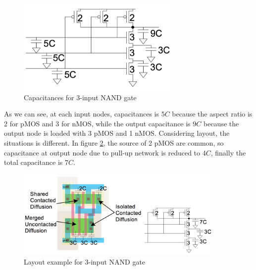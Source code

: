 \begin{figure}[htbp]
\begin{center}
\includegraphics[width=0.7\textwidth]{img/nand_3_cap.jpg}
\caption{Capacitances for 3-input NAND gate}
\label{fig:nand_3_cap}
\end{center}
\end{figure}
As we can see, at each input nodes, capacitances is $5C$ because the aspect ratio is 2 for pMOS and 3 for nMOS, while the output capacitance is $9C$ because the output node is loaded with 3 pMOS and 1 nMOS. Considering layout, the situations is different. In figure \ref{fig:nand_layout}, the source of 2 pMOS are common, so capacitance at output node due to pull-up network is reduced to $4C$, finally the total capacitance is $7C$.
\begin{figure}[htbp]
\begin{center}
\includegraphics[width=0.9\textwidth]{img/nand_3_layout.jpg}
\caption{Layout example for 3-input NAND gate}
\label{fig:nand_layout}
\end{center}
\end{figure}

